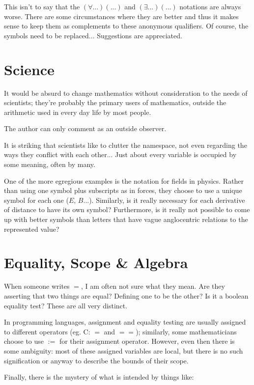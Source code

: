 This isn't to say that the $(\forall...)(...)$ and $(\exists...)(...)$ notations are always worse. There are some circumstances where they are better and thus it makes sense to keep them as complements to these anonymous qualifiers. Of course, the symbols need to be replaced... Suggestions are appreciated.



\section{Science}

It would be absurd to change mathematics without consideration to the needs of scientists; they're probably the primary users of mathematics, outside the arithmetic used in every day life by most people. 

The author can only comment as an outside observer.

It is striking that scientists like to clutter the namespace, not even regarding the ways they conflict with each other... Just about every variable is occupied by some meaning, often by many.

One of the more egregious examples is the notation for fields in physics. Rather than using one symbol plus subscripts as in forces, they choose to use a unique symbol for each one ($E$, $B$...). Similarly, is it really necessary for each derivative of distance to have its own symbol? Furthermore, is it really not possible to come up with better symbols than letters that have vague anglocentric relations to the represented value?

\section{Equality, Scope \& Algebra}

When someone writes $=$, I am often not sure what they mean. Are they asserting that two things are equal? Defining one to be the other? Is it a boolean equality test? These are all very distinct.

In programming languages, assignment and equality testing are usually assigned to different operators (eg. C: $=$ and $==$); similarly, some mathematicians choose to use $:=$ for their assignment operator. However, even then there is some ambiguity: most of these assigned variables are local, but there is no such signification or anyway to describe the bounds of their scope.

Finally, there is the mystery of what is intended by things like:

